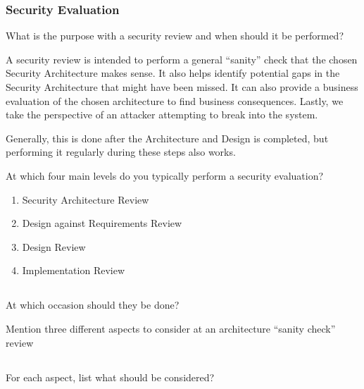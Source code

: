 \section{Security Evaluation}\label{sec:Security_Evaluation}
\begin{questions}
\question{} What is the purpose with a security review and when should it be performed?
  \begin{solution}
    A security review is intended to perform a general ``sanity'' check that the chosen Security Architecture makes sense.
    It also helps identify potential gaps in the Security Architecture that might have been missed.
    It can also provide a business evaluation of the chosen architecture to find business consequences.
    Lastly, we take the perspective of an attacker attempting to break into the system.

    Generally, this is done after the Architecture and Design is completed, but performing it regularly during these steps also works.
  \end{solution}

\question{} At which four main levels do you typically perform a security evaluation?
  \begin{solution}
    \begin{enumerate}[noitemsep]
    \item Security Architecture Review
    \item Design against Requirements Review
    \item Design Review
    \item Implementation Review
    \end{enumerate}
  \end{solution}

  \begin{parts}
  \part{} At which occasion should they be done?
  \end{parts}

\question{} Mention three different aspects to consider at an architecture ``sanity check'' review
  \begin{parts}
  \part{} For each aspect, list what should be considered?
  \end{parts}


\end{questions}
